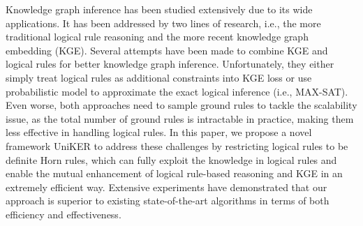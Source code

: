 Knowledge graph inference has been studied extensively due to its wide applications. It has been addressed by two lines of research, i.e., the more traditional logical rule reasoning and the more recent knowledge graph embedding (KGE). Several attempts have been made to combine KGE and logical rules for better knowledge graph inference. Unfortunately, they either simply treat logical rules as additional constraints into KGE loss or use probabilistic model to approximate the exact logical inference (i.e., MAX-SAT). Even worse, both approaches need to sample ground rules to tackle the scalability issue, as the total number of ground rules is intractable in practice, making them less effective in handling logical rules. In this paper, we propose a novel framework UniKER to address these challenges by restricting logical rules to be definite Horn rules, which can fully exploit the knowledge in logical rules and enable the mutual enhancement of logical rule-based reasoning and KGE in an extremely efficient way. Extensive experiments have demonstrated that our approach is superior to existing state-of-the-art algorithms in terms of both efficiency and effectiveness.
